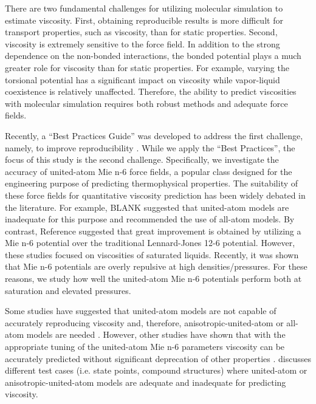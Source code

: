 \documentclass[preprint,review,12pt]{elsarticle}
\begin{document}
	
	There are two fundamental challenges for utilizing molecular simulation to estimate viscosity. First, obtaining reproducible results is more difficult for transport properties, such as viscosity, than for static properties. Second, viscosity is extremely sensitive to the force field. In addition to the strong dependence on the non-bonded interactions, the bonded potential plays a much greater role for viscosity than for static properties. For example, varying the torsional potential has a significant impact on viscosity while vapor-liquid coexistence is relatively unaffected. Therefore, the ability to predict viscosities with molecular simulation requires both robust methods and adequate force fields. 
	
	
	Recently, a ``Best Practices Guide'' was developed to address the first challenge, namely, to improve reproducibility \cite{Maginn2018}. While we apply the ``Best Practices'', the focus of this study is the second challenge. Specifically, we investigate the accuracy of united-atom Mie n-6 force fields, a popular class designed for the engineering purpose of predicting thermophysical properties. The suitability of these force fields for quantitative viscosity prediction has been widely debated in the literature. For example, BLANK suggested that united-atom models are inadequate for this purpose and recommended the use of all-atom models. By contrast, Reference  suggested that great improvement is obtained by utilizing a Mie n-6 potential over the traditional Lennard-Jones 12-6 potential. However, these studies focused on viscosities of saturated liquids. Recently, it was shown that Mie n-6 potentials are overly repulsive at high densities/pressures. For these reasons, we study how well the united-atom Mie n-6 potentials perform both at saturation and elevated pressures.
	
	Some studies have suggested that united-atom models are not capable of accurately reproducing viscosity and, therefore, anisotropic-united-atom or all-atom models are needed \cite{Allen1987,Payal2012,Mondello1997}. However, other studies have shown that with the appropriate tuning of the united-atom Mie n-6 parameters viscosity can be accurately predicted without significant deprecation of other properties \cite{Gordon2006}. \cite{Ungerer2007} discusses different test cases (i.e. state points, compound structures) where united-atom or anisotropic-united-atom models are adequate and inadequate for predicting viscosity.
   
\end{document}
